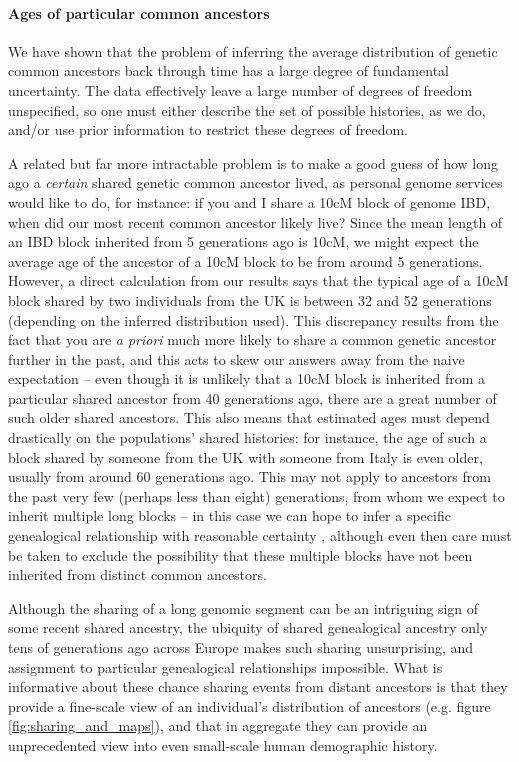 \documentclass{article}
\begin{document}
\paragraph{Ages of particular common ancestors}
We have shown that the problem of inferring the average distribution of genetic common ancestors back through time
has a large degree of fundamental uncertainty.
The data effectively leave a large number of degrees of freedom unspecified,
so one must either describe the set of possible histories, as we do,
and/or use prior information to restrict these degrees of freedom.

A related but far more intractable problem is
to make a good guess of how long ago a {\em certain} shared genetic common ancestor lived,
as personal genome services would like to do, for instance:
if you and I share a 10cM block of genome IBD, 
when did our most recent common ancestor likely live?
Since the mean length of an IBD block inherited from 5 generations ago is 10cM,
we might expect the average age of the ancestor of a 10cM block to be from around 5 generations.
However, a direct calculation from our results says that the typical age of a 10cM block shared by two individuals from the UK is between 32 and 52 generations
(depending on the inferred distribution used). 
This discrepancy results from the fact that you are {\it a priori}
much more likely to share a common genetic ancestor further in the
past, and this acts to skew our answers away from the naive expectation
-- even though it is unlikely that a 10cM block is inherited from a particular shared ancestor from 40 generations ago,
there are a great number of such older shared ancestors. 
This also means that estimated ages must depend drastically on the populations' shared histories:
for instance, the age of such a block shared by someone from the UK with someone
from Italy is even older, usually from around 60 generations ago.
This may not apply to ancestors from the past very few (perhaps less than eight) generations,
from whom we expect to inherit multiple long blocks --
in this case we can hope
to infer a specific genealogical relationship with reasonable certainty
\citep[e.g.][]{huff2011maximumlikelihood,henn2012cryptic}, 
although even then care must be taken to exclude the
possibility that these multiple blocks have
not been inherited from distinct common ancestors.

Although the sharing of a long genomic segment can be an intriguing
sign of some recent shared ancestry,
the ubiquity of shared genealogical ancestry only tens of generations ago 
across Europe \citep[and likely the world,][]{rohde2004modelling}
makes such sharing unsurprising, and assignment to particular
genealogical relationships impossible.
What is informative about these chance sharing events from distant ancestors is that 
they provide a fine-scale view of an individual's distribution of ancestors
(e.g. figure \ref{fig:sharing_and_maps}),
and that in aggregate they can provide an unprecedented view 
into even small-scale human demographic history. 
\end{document}
